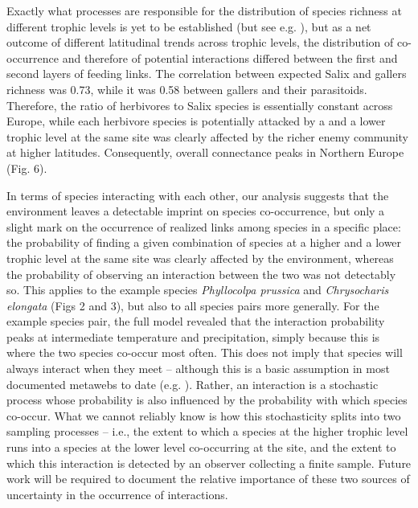 \documentclass[12pt]{article}
\begin{document}
Exactly what processes are responsible for the distribution of species
richness at different trophic levels is yet to be established (but see e.g.
\citealt{Roininen2005, Nyman2010, Leppanen2014}), but as a net outcome of
different latitudinal trends across trophic levels, the distribution of co-
occurrence and therefore of potential interactions differed between the first
and second layers of feeding links. The correlation between expected Salix and gallers
richness was 0.73, while it was 0.58 between gallers and their parasitoids.
Therefore, the ratio of herbivores to Salix species is essentially constant
across Europe, while each herbivore species is potentially attacked by a and
a lower trophic level at the same site was clearly affected by the richer
enemy community at higher latitudes. Consequently, overall connectance peaks
in Northern Europe (Fig. 6).

In terms of species interacting with each other, our analysis suggests that the
environment leaves a detectable imprint on species co-occurrence, but only a
slight mark on the occurrence of realized links among species in a specific
place: the probability of finding a given combination of species at a higher
and a lower trophic level at the same site was clearly affected by the
environment, whereas the probability of observing an interaction between the
two was not detectably so. This applies to the example species \textit{Phyllocolpa
prussica} and \textit{Chrysocharis elongata} (Figs 2 and 3), but also to all species pairs
more generally. For the example species pair, the full model revealed that the
interaction probability peaks at intermediate temperature and
precipitation, simply because this is where the two species co-occur most
often. This does not imply that species will always interact when they meet –
although this is a basic assumption in most documented metawebs to date (e.g.
\citealt{Havens1992, Wood2015}). Rather, an interaction is a stochastic process whose
probability is also influenced by the probability with which species co-occur.
What we cannot reliably know is how this stochasticity splits into two
sampling processes – i.e., the extent to which a species at the higher trophic
level runs into a species at the lower level co-occurring at the site, and the
extent to which this interaction is detected by an observer collecting a
finite sample. Future work will be required to document the relative
importance of these two sources of uncertainty in the occurrence of
interactions.

\end{document}
